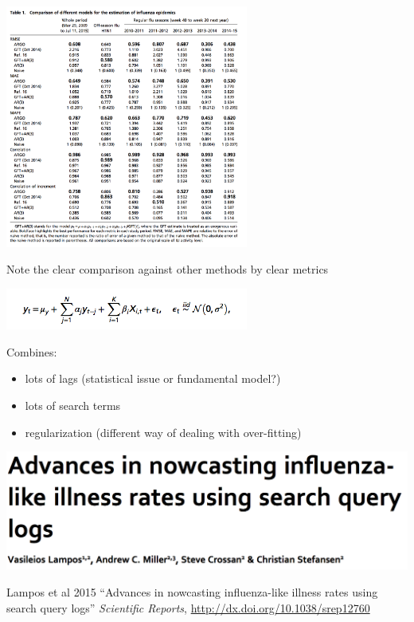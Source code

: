 \documentclass[aspectratio=169]{beamer}
\begin{document}
\begin{frame}

\begin{center}
\includegraphics[width=0.6\textwidth]{figures/yang_accurate_2015_tab1}
\end{center}

Note the clear comparison against other methods by clear metrics

\end{frame}
\begin{frame}

\begin{center}
\includegraphics[width=0.6\textwidth]{figures/yang_accurate_2015_eq2}
\end{center}

Combines:
\begin{itemize}
\item lots of lags (statistical issue or fundamental model?)
\item lots of search terms
\item regularization (different way of dealing with over-fitting)
\end{itemize}

\end{frame}
\begin{frame}

\begin{center}
\includegraphics[width=\textwidth]{figures/lampos_advances_2015_title}
\end{center}

Lampos et al 2015 ``Advances in nowcasting influenza-like illness rates using search query logs'' \textit{Scientific Reports}, \url{http://dx.doi.org/10.1038/srep12760}

\end{frame}
\end{document}
